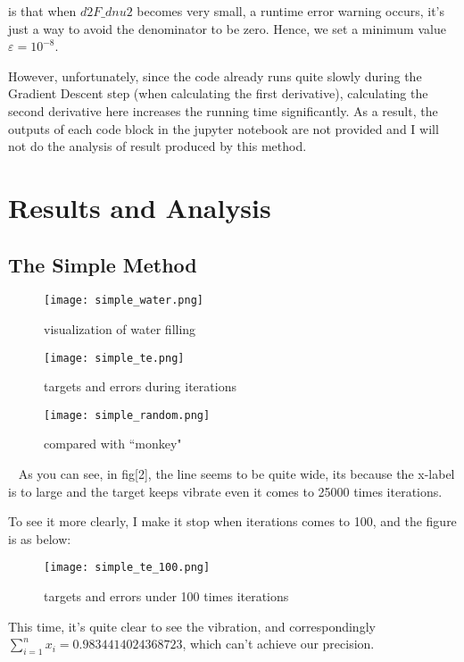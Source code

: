 \documentclass[a4paper,12pt]{article}
\begin{document}
is that when \( d2F\_dnu2 \) becomes very small, a runtime error warning occurs, it's just a way to avoid the denominator to be zero. Hence, we set a minimum value $\varepsilon  = 10^{-8}$.

However, unfortunately, since the code already runs quite slowly during the Gradient Descent step (when calculating the first derivative), calculating the second derivative here increases the running time significantly. As a result, the outputs of each code block in the jupyter notebook are not provided and I will not do the analysis of result produced by this method.
    \section{Results and Analysis}
    \subsection{The Simple Method}
    \begin{figure}[H]
        \centering
        \texttt{[image: simple\_water.png]}
        \caption{visualization of water filling}
    \end{figure}
    \begin{figure}[H]
        \centering
        \texttt{[image: simple\_te.png]}
        \caption{targets and errors during iterations}
    \end{figure}
    \begin{figure}[H]
        \centering
        \texttt{[image: simple\_random.png]}
        \caption{compared with ``monkey"}
    \end{figure}
    \
    \newline
    \indent As you can see, in fig[2], the line seems to be quite wide, its because the x-label is to large and the target keeps vibrate even it comes to 25000 times iterations.
    
    To see it more clearly, I make it stop when iterations comes to 100, and the figure is as below:
    \begin{figure}[H]
        \centering
        \texttt{[image: simple\_te\_100.png]}
        \caption{targets and errors under 100 times iterations}
    \end{figure}

    This time, it's quite clear to see the vibration, and correspondingly\\
    $\sum_{i=1}^{n} x_i = 0.9834414024368723$, which can't achieve our precision.
\end{document}
